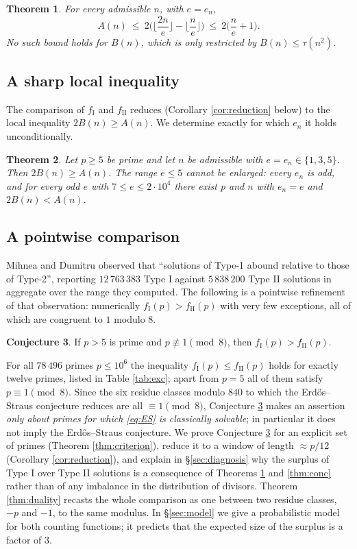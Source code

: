 \documentclass[11pt,reqno]{amsart}
\theoremstyle{plain}
\newtheorem{theorem}{Theorem}[section]
\theoremstyle{definition}
\newtheorem{conjecture}[theorem]{Conjecture}
\numberwithin{equation}{section}
\newcommand{\fI}{f_{\mathrm{I}}}
\newcommand{\fII}{f_{\mathrm{II}}}
\begin{document}
\begin{theorem}\label{thm:Abound}
For every admissible $n$, with $e=e_{n}$,
\[
  A(n)\ \le\ 2\Big(\Big\lfloor\frac{2n}{e}\Big\rfloor-\Big\lfloor\frac ne\Big\rfloor\Big)\ \le\ 2\Big(\frac ne+1\Big).
\]
No such bound holds for $B(n)$, which is only restricted by $B(n)\le\tau(n^{2})$.
\end{theorem}

\subsection{A sharp local inequality}
The comparison of $\fI$ and $\fII$ reduces (Corollary \ref{cor:reduction} below) to
the local inequality $2B(n)\ge A(n)$. We determine exactly for which $e_{n}$ it holds
unconditionally.

\begin{theorem}\label{thm:e5}
Let $p\ge5$ be prime and let $n$ be admissible with $e=e_{n}\in\{1,3,5\}$. Then
$2B(n)\ge A(n)$. The range $e\le5$ cannot be enlarged: every $e_{n}$ is odd, and for
every odd $e$ with $7\le e\le2\cdot10^{4}$ there exist $p$ and $n$ with $e_{n}=e$ and
$2B(n)<A(n)$.
\end{theorem}

\subsection{A pointwise comparison}
Mihnea and Dumitru \cite{MihneaDumitru} observed that ``solutions of Type-1 abound
relative to those of Type-2'', reporting $12\,763\,383$ Type I against $5\,838\,200$
Type II solutions in aggregate over the range they computed. The following is a
pointwise refinement of that observation: numerically $\fI(p)>\fII(p)$ with very few
exceptions, all of which are congruent to $1$ modulo $8$.

\begin{conjecture}\label{conj:main}
If $p>5$ is prime and $p\not\equiv1\pmod 8$, then $\fI(p)>\fII(p)$.
\end{conjecture}

For all $78\,496$ primes $p\le10^{6}$ the inequality $\fI(p)\le\fII(p)$ holds for
exactly twelve primes, listed in Table \ref{tab:exc}; apart from $p=5$ all of them
satisfy $p\equiv1\pmod8$. Since the six residue classes modulo $840$ to which the
Erd\H{o}s--Straus conjecture reduces \cite{Oblath,Rosati,Yamamoto} are all
$\equiv1\pmod8$, Conjecture
\ref{conj:main} makes an assertion \emph{only about primes for which \eqref{eq:ES} is
classically solvable}; in particular it does not imply the Erd\H{o}s--Straus
conjecture. We prove Conjecture \ref{conj:main} for an explicit set of primes
(Theorem \ref{thm:criterion}), reduce it to a window of length $\approx p/12$
(Corollary \ref{cor:reduction}), and explain in \S\ref{sec:diagnosis} why the surplus
of Type I over Type II solutions is a consequence of Theorems \ref{thm:Abound} and
\ref{thm:conc} rather than of any imbalance in the distribution of divisors. Theorem
\ref{thm:duality} recasts the whole comparison as one between two residue classes,
$-p$ and $-1$, to the same modulus. In
\S\ref{sec:model} we give a probabilistic model for both counting functions; it
predicts that the expected size of the surplus is a factor of $3$.
\end{document}
